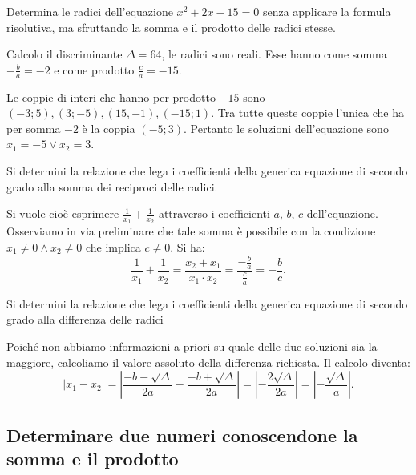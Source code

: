 \begin{esempio}
Determina le radici dell'equazione $x^{2} + 2 x - 15 = 0$ senza applicare la 
formula risolutiva, ma sfruttando la somma e il prodotto delle radici stesse.

Calcolo il discriminante $\Delta = 64$, le radici sono reali. Esse hanno come 
somma~$- \frac{b}{a} = -2$ e come prodotto $\frac{c}{a} = -15$.

Le coppie di interi che hanno per prodotto $-15$ sono $(-3; 5),(3;-5), 
(15,-1),(-15; 1)$. Tra tutte queste coppie l'unica che ha per somma $-2$ è la 
coppia $(-5;3)$.
Pertanto le soluzioni dell'equazione sono $x_{1} = -5 \vee x_{2} = 3$.
\end{esempio}

\begin{esempio}
Si determini la relazione che lega i coefficienti della generica equazione di 
secondo grado alla somma dei reciproci delle radici.

Si vuole cioè esprimere $\frac{1}{x_{1}} + \frac{1}{x_{2}}$ attraverso i 
coefficienti $a$, $b$, $c$ dell'equazione. Osserviamo in via preliminare che 
tale somma è possibile con la condizione $x_{1} \neq 0 \wedge x_{2} \neq 0$ che 
implica $c \neq 0$. Si ha: 
\[\frac{1}{x_{1}} + \frac{1}{x_{2}} = \frac{x_{2} + x_{1}}{x
_{1} \cdot x_{2}} = \frac{- \frac{b}{a}}{\frac{c}{a}} = - \frac{b}{c}.\]
\end{esempio}

\begin{esempio}
Si determini la relazione che lega i coefficienti della generica equazione di 
secondo grado alla differenza delle radici

Poiché non abbiamo informazioni a priori su quale delle due soluzioni sia la 
maggiore, calcoliamo il valore assoluto della differenza richiesta. Il calcolo 
diventa: \[
\left\lvert x_{1} - x_{2} \right\rvert = \left\lvert \frac{- b 
-\sqrt{\Delta}}{2 
a} - \frac{- b + \sqrt{\Delta}}{2 a} \right\rvert =\left\lvert - \frac{2 
\sqrt{\Delta}}{2 a} \right\rvert = \left\lvert -\frac{\sqrt{\Delta}}{a} 
\right\rvert.
\]
\end{esempio}

\subsection{Determinare due numeri conoscendone la somma e il prodotto}

